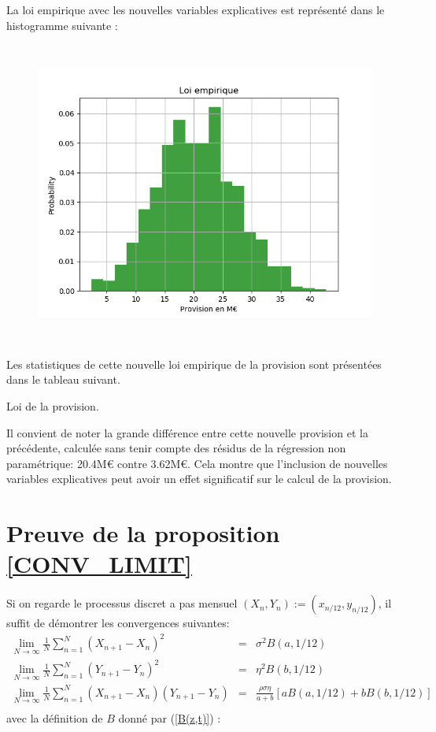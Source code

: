 \documentclass[12pt, a4paper]{book}
\begin{document}
{La loi empirique avec les nouvelles variables explicatives est représenté dans le histogramme suivante :


\begin{figure}[!h]
\label{loi_empirique_e}
\centering
\includegraphics[height=10cm,width=16cm]{loi_empirique_e.png}
\end{figure}

Les statistiques de cette nouvelle loi empirique de la provision sont présentées dans le tableau suivant.

\begin{table}[h!]
	\caption{Loi de la provision.}
	\bigskip	
	\label{per_provision_e}
	\centering
\end{table}

Il convient de noter la grande différence entre cette nouvelle provision et la précédente, calculée sans tenir compte des résidus de la régression non paramétrique: 20.4M\euro{} contre 3.62M\euro. Cela montre que l'inclusion de nouvelles variables explicatives peut avoir un effet significatif sur le calcul de la provision.

\section{Preuve de la proposition \ref{CONV_LIMIT}}

Si on regarde le processus discret a pas mensuel $(X_n,Y_n):=(x_{n/12}, y_{n/12})$, il suffit de démontrer les convergences suivantes: 
\begin{eqnarray}
\lim_{N\rightarrow \infty}\frac{1}{N}\sum_{n=1}^N (X_{n+1}-X_n)^2&=&\sigma ^2 B(a,1/12)\label{x_pearson}\\
\lim_{N\rightarrow \infty}\frac{1}{N}\sum_{n=1}^N (Y_{n+1}-Y_n)^2&=&\eta ^2 B(b,1/12)\label{y_pearson}\\
\lim_{N\rightarrow \infty}\frac{1}{N}\sum_{n=1}^N (X_{n+1}-X_n)(Y_{n+1}-Y_n)&=&\frac{\rho \sigma\eta}{a+b}[aB(a,1/12)+bB(b,1/12)]\nonumber\\
\label{xy_pearson}
\end{eqnarray}
avec la définition de $B$ donné par (\ref{B(z,t)}) : 




}
\end{document}
